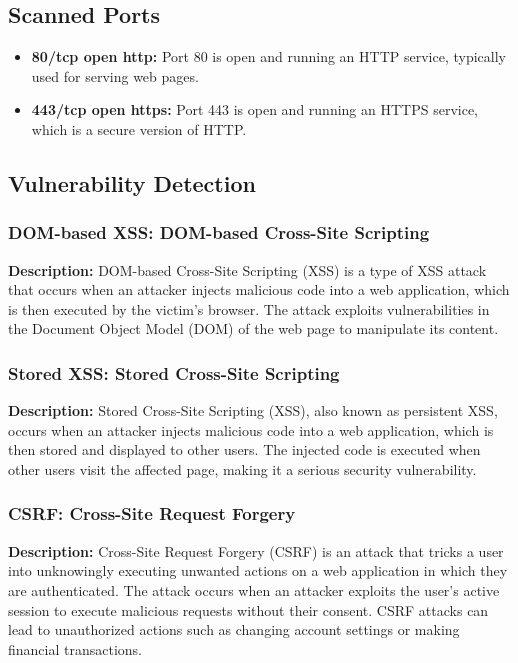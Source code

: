 \documentclass[11pt]{article}
\begin{document}
\subsection*{Scanned Ports}
\begin{itemize}
    \item \textbf{80/tcp  open  http:} Port 80 is open and running an HTTP service, typically used for serving web pages.
    \item \textbf{443/tcp open  https:} Port 443 is open and running an HTTPS service, which is a secure version of HTTP.
\end{itemize}

\subsection*{Vulnerability Detection}

\subsubsection*{DOM-based XSS: DOM-based Cross-Site Scripting}

\textbf{Description:} DOM-based Cross-Site Scripting (XSS) is a type of XSS attack that occurs when an attacker injects malicious code into a web application, which is then executed by the victim's browser. The attack exploits vulnerabilities in the Document Object Model (DOM) of the web page to manipulate its content.

\subsubsection*{Stored XSS: Stored Cross-Site Scripting}

\textbf{Description:} Stored Cross-Site Scripting (XSS), also known as persistent XSS, occurs when an attacker injects malicious code into a web application, which is then stored and displayed to other users. The injected code is executed when other users visit the affected page, making it a serious security vulnerability.

\subsubsection*{CSRF: Cross-Site Request Forgery}

\textbf{Description:} Cross-Site Request Forgery (CSRF) is an attack that tricks a user into unknowingly executing unwanted actions on a web application in which they are authenticated. The attack occurs when an attacker exploits the user's active session to execute malicious requests without their consent. CSRF attacks can lead to unauthorized actions such as changing account settings or making financial transactions.
\end{document}
